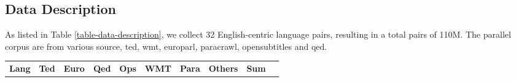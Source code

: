 \documentclass[11pt,a4paper]{article}
\begin{document}
\subsection{Data Description}
As listed in Table \ref{table-data-description}, we collect 32 English-centric language pairs, resulting in a total pairs of 110M. The parallel corpus are from various source, ted, wmt,
europarl, paracrawl, opensubtitles and qed.


\begin{table*}[htb]
\begin{tabular}{lrrrrrrrrr}
\toprule
 {\textbf{Lang}}&
  {\textbf{Ted}}    & {\textbf{Euro}} & {\textbf{Qed}}    & {\textbf{Ops}} & {\textbf{WMT}}   & {\textbf{Para}} & {\textbf{Others}} & {\textbf{Sum}}  \\


\end{tabular}
\end{table*}
\end{document}
